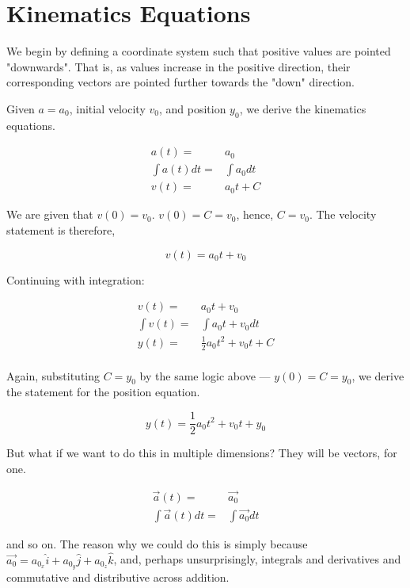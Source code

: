 \documentclass[letterpaper]{article}
\begin{document}
\section{Kinematics Equations}
\label{sec:org3c9e371}
We begin by defining a coordinate system such that positive values are pointed "downwards". That is, as values increase in the positive direction, their corresponding vectors are pointed further towards the "down" direction.

Given \(a=a_0\), initial velocity \(v_0\), and position \(y_0\), we derive the kinematics equations.

\begin{align}
    a(t) =& a_0 \\
    \int a(t) dt =& \int a_0 dt \\
    v(t) =& a_0t + C 
\end{align}

We are given that \(v(0)=v_0\). \(v(0) = C = v_0\), hence, \(C=v_0\). The velocity statement is therefore,

\begin{equation}
    v(t) = a_0t+v_0
\end{equation}

Continuing with integration:

\begin{align}
    v(t) =& a_0t + v_0 \\
    \int v(t) =& \int a_0t + v_0 dt \\
    y(t) =& \frac{1}{2}a_0t^2+v_0t+C \\
\end{align}

Again, substituting \(C = y_0\) by the same logic above --- \(y(0) = C = y_0\), we derive the statement for the position equation.

\begin{equation}
    y(t) = \frac{1}{2}a_0t^2 + v_0t + y_0
\end{equation}

But what if we want to do this in multiple dimensions? They will be vectors, for one.

\begin{align}
    \vec{a}(t) =& \vec{a_0} \\
    \int\vec{a}(t)dt =& \int\vec{a_0} dt
\end{align}

and so on. The reason why we could do this is simply because \(\vec{a_0} = a_0_x \hat{i} + a_0_y\hat{j} + a_0_z\hat{k}\), and, perhaps unsurprisingly, integrals and derivatives and commutative and distributive across addition.
\end{document}
